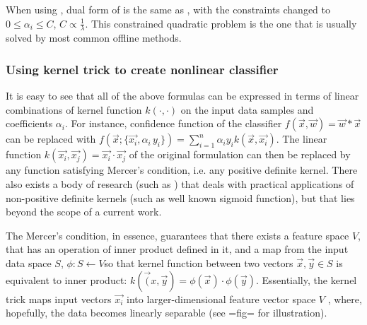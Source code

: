 When using , dual form of  is the same as , with the constraints changed to $0 \le \alpha_i \le C$, $C \propto \frac{1}{\lambda}$. This constrained quadratic problem is the one that is usually solved by most common offline methods.

\subsubsection{Using kernel trick to create nonlinear classifier}

It is easy to see that all of the above formulas can be expressed in terms of linear combinations of kernel function $k(\cdot,\cdot)$ on the input data samples and coefficients $\alpha_i$. For instance, confidence function of the classifier $f(\vec{x},\vec{w})=\vec{w}*\vec{x}$  can be replaced with $f(\vec{x};\{\vec{x_i},\alpha_i\,y_i\})=\sum_{i=1}^{n}\alpha_i y_i k(\vec{x},\vec{x_i})$. The linear function $k(\vec{x_i},\vec{x_j})=\vec{x_i}\cdot \vec{x_j}$ of the original formulation can then be replaced by any function satisfying Mercer's condition, i.e. any positive definite kernel. There also exists a body of research (such as \cite{negative}) that deals with practical applications of non-positive definite kernels (such as well known sigmoid function), but that lies beyond the scope of a current work. 

 The Mercer's condition, in essence, guarantees that there exists a feature space $V$, that has an operation of inner product defined in it,  and a map from the input data space $S$, $\phi : S \leftarrow V$so that kernel function between two vectors $\vec{x},\vec{y} \in S$ is equivalent to inner product: $k(\vec({x},\vec{y})=\phi(\vec{x})\cdot \phi(\vec{y})$. Essentially, the kernel trick maps input vectors $\vec{x_i}$ into larger-dimensional feature vector space $V$ , where, hopefully, the data becomes linearly separable (see {{=fig=}} for illustration).

